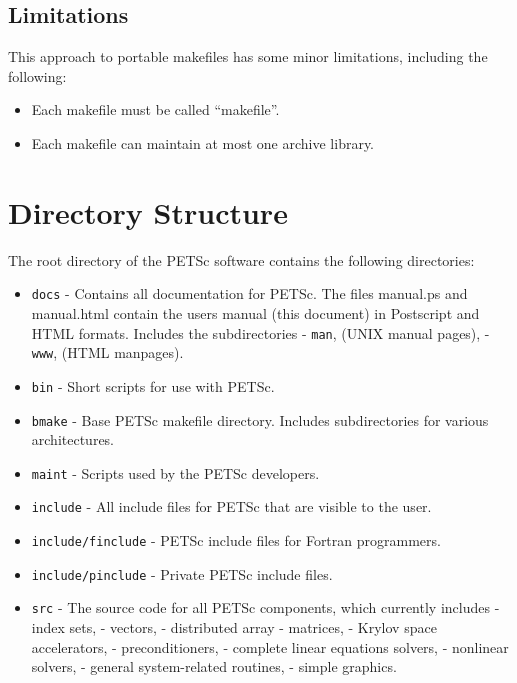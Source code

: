 \section{Limitations}

This approach to portable makefiles has some minor limitations, including
the following:
\begin{itemize}
\item Each makefile must be called ``makefile''.
\item Each makefile can maintain at most one archive library.
\end{itemize}



\chapter{Directory Structure}

The root directory of the PETSc software contains the following directories:
\begin{itemize}
\item {\tt docs} - Contains all documentation for PETSc. The files manual.ps
                   and manual.html contain the users manual (this 
                   document) in Postscript and HTML formats. Includes the
                   subdirectories
 \subitem - {\tt man}, (UNIX manual pages),
 \subitem - {\tt www}, (HTML manpages).
\item {\tt bin} - Short scripts for use with PETSc.
\item {\tt bmake} - Base PETSc makefile directory.  Includes subdirectories
                    for various architectures.
\item {\tt maint} - Scripts used by the PETSc developers.
\item {\tt include} - All include files for PETSc that are visible to the user.
\item {\tt include/finclude} - PETSc include files for Fortran programmers.
\item {\tt include/pinclude} - Private PETSc include files.
\item {\tt src} - The source code for all PETSc components, which
                  currently includes
  - index sets,
  - vectors,
  - distributed array
  - matrices,
  - Krylov space accelerators,
  - preconditioners,
  - complete linear equations solvers,
  - nonlinear solvers,
  - general system-related routines,
  - simple graphics.
\end{itemize}

